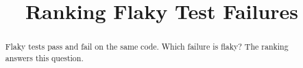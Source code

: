 \documentclass[conference]{IEEEtran}
\begin{document}
\title{Ranking Flaky Test Failures}
\author{}
\maketitle
\begin{abstract}
Flaky tests pass and fail on the same code. Which failure is flaky? The ranking answers this question.
\end{abstract}



\end{document}
